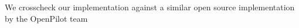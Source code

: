 \documentclass[]{article}
\begin{document}
{	We crosscheck our implementation against a similar open source implementation by the OpenPilot team %



\clearpage
\nocite{*}

\printbibliography
% 









}
\end{document}
